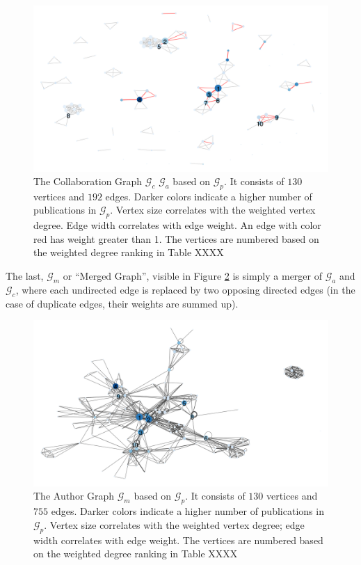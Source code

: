 \documentclass[11pt,a4paper]{book}
\theoremstyle{definition}
\theoremstyle{definition}
\theoremstyle{definition}
\theoremstyle{remark}
\newcommand{\pgraph}{\mathcal{G}_{p}}
\newcommand{\agraph}{\mathcal{G}_{a}}
\newcommand{\cgraph}{\mathcal{G}_{c}}
\newcommand{\acgraph}{\mathcal{G}_{m}}
\begin{document}
\begin{figure}[h!]
\includegraphics[width=\textwidth]{collab_graph.png}
\caption{The Collaboration Graph  $\cgraph$ $\agraph$ based on $\pgraph$. It consists of  $130$ vertices and $192$ edges. 
Darker colors indicate a higher number of publications in $\pgraph$. Vertex size correlates with the weighted vertex degree.
Edge width correlates with edge weight. An edge with color red has weight greater than 1. The vertices are numbered based on the weighted degree ranking in Table XXXX}
\label{fig:cgraph-actual_graph}
\end{figure}

The last, $\acgraph$ or ``Merged Graph'', visible in Figure \ref{fig:acgraph-actual_graph} is simply a merger of $\agraph$ and $\cgraph$, where each undirected edge is replaced by two opposing directed edges (in the case of duplicate edges, their weights are summed up).


\begin{figure}[h!]
\includegraphics[width=\textwidth]{mauthor_graph.png}
\caption{The Author Graph  $\acgraph$ based on $\pgraph$. It consists of  $130$ vertices and $755$ edges. 
Darker colors indicate a higher number of publications in $\pgraph$. Vertex size correlates with the weighted vertex degree; 
edge width correlates with edge weight. The vertices are numbered based on the weighted degree ranking in Table XXXX}
\label{fig:acgraph-actual_graph}
\end{figure}
\end{document}
